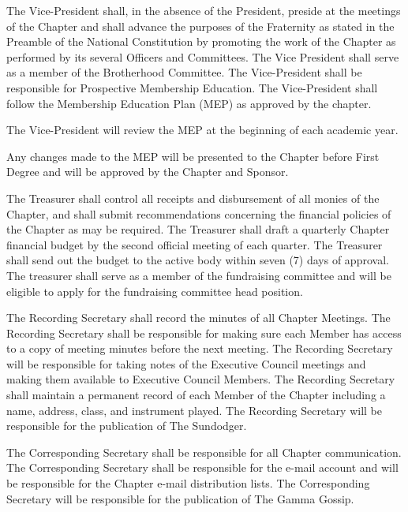 \documentclass[11pt]{article}
\begin{document}
\begin{legal}
    The Vice-President shall, in the absence of the President, preside at the meetings of the Chapter and shall advance the purposes of the Fraternity as stated in the Preamble of the National Constitution by promoting the work of the Chapter as performed by its several Officers and Committees.
    The Vice President shall serve as a member of the Brotherhood Committee.
    The Vice-President shall be responsible for Prospective Membership Education.
    The Vice-President shall follow the Membership Education Plan (MEP) as approved by the chapter.
    \begin{legal}
      \item
        The Vice-President will review the MEP at the beginning of each academic year.
      \item
        Any changes made to the MEP will be presented to the Chapter before First Degree and will be approved by the Chapter and Sponsor.
    \end{legal}
  \item
    The Treasurer shall control all receipts and disbursement of all monies of the Chapter, and shall submit recommendations concerning the financial policies of the Chapter as may be required.
    The Treasurer shall draft a quarterly Chapter financial budget by the second official meeting of each quarter. The Treasurer shall send out the budget to the active body within seven (7) days of approval.
    The treasurer shall serve as a member of the fundraising committee and will be eligible to apply for the fundraising committee head position. 
  \item
    The Recording Secretary shall record the minutes of all Chapter Meetings.
    The Recording Secretary shall be responsible for making sure each Member has access to a copy of meeting minutes before the next meeting.
    The Recording Secretary will be responsible for taking notes of the Executive Council meetings and making them available to Executive Council Members.
    The Recording Secretary shall maintain a permanent record of each Member of the Chapter including a name, address, class, and instrument played.
    The Recording Secretary will be responsible for the publication of The Sundodger.
  \item
    The Corresponding Secretary shall be responsible for all Chapter communication.
    The Corresponding Secretary shall be responsible for the e-mail account and will be responsible for the Chapter e-mail distribution lists.
    The Corresponding Secretary will be responsible for the publication of The Gamma Gossip.

\end{legal}
\end{document}
